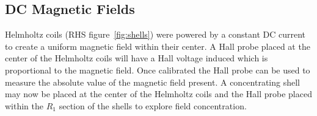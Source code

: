 \documentclass[11pt]{iopart}
\begin{document}
\subsection{DC Magnetic Fields}
Helmholtz coils (RHS figure~\ref{fig:shells}) were powered by a constant
DC current to create a uniform magnetic field within their
center.
A Hall probe placed at the center of the Helmholtz coils will have a
Hall voltage induced which is proportional to the magnetic field. Once
calibrated the Hall probe can be used to measure the absolute value of
the magnetic field present. A concentrating shell may now be placed at
the center of the Helmholtz coils and the Hall probe placed within the
$R_1$ section of the shells to explore field concentration.



\end{document}
